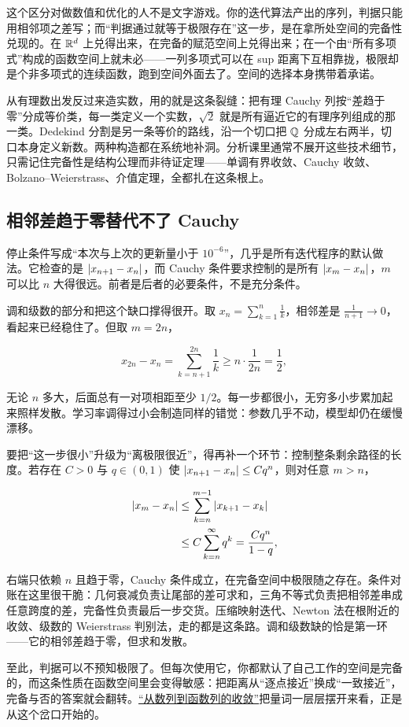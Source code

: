 这个区分对做数值和优化的人不是文字游戏。你的迭代算法产出的序列，判据只能用相邻项之差写；而``判据通过就等于极限存在''这一步，是在拿所处空间的完备性兑现的。在 \(\mathbb{R}^d\) 上兑得出来，在完备的赋范空间上兑得出来；在一个由``所有多项式''构成的函数空间上就未必——一列多项式可以在 sup 距离下互相靠拢，极限却是个非多项式的连续函数，跑到空间外面去了。空间的选择本身携带着承诺。

从有理数出发反过来造实数，用的就是这条裂缝：把有理 Cauchy 列按``差趋于零''分成等价类，每一类定义一个实数，\(\sqrt2\) 就是所有逼近它的有理序列组成的那一类。Dedekind 分割是另一条等价的路线，沿一个切口把 \(\mathbb{Q}\) 分成左右两半，切口本身定义新数。两种构造都在系统地补洞。分析课里通常不展开这些技术细节，只需记住完备性是结构公理而非待证定理——单调有界收敛、Cauchy 收敛、Bolzano--Weierstrass、介值定理，全都扎在这条根上。

\subsection{相邻差趋于零替代不了 Cauchy}

停止条件写成``本次与上次的更新量小于 \(10^{-6}\)''，几乎是所有迭代程序的默认做法。它检查的是 \(\left|x_{n+1}-x_n\right|\)，而 Cauchy 条件要求控制的是所有 \(\left|x_m-x_n\right|\)，\(m\) 可以比 \(n\) 大得很远。前者是后者的必要条件，不是充分条件。

调和级数的部分和把这个缺口撑得很开。取 \(x_n=\sum_{k=1}^{n}\frac1k\)，相邻差是 \(\frac1{n+1}\to0\)，看起来已经稳住了。但取 \(m=2n\)，

\[
x_{2n}-x_n = \sum_{k=n+1}^{2n}\frac1k \ge n\cdot\frac1{2n} = \frac12,
\]

无论 \(n\) 多大，后面总有一对项相距至少 \(1/2\)。每一步都很小，无穷多小步累加起来照样发散。学习率调得过小会制造同样的错觉：参数几乎不动，模型却仍在缓慢漂移。

要把``这一步很小''升级为``离极限很近''，得再补一个环节：控制整条剩余路径的长度。若存在 \(C>0\) 与 \(q\in(0,1)\) 使 \(\left|x_{n+1}-x_n\right|\le Cq^n\)，则对任意 \(m>n\)，

\[
\begin{aligned}
\left|x_m-x_n\right|
&\le \sum_{k=n}^{m-1} \left|x_{k+1}-x_k\right|\\
&\le C\sum_{k=n}^{\infty} q^k
= \frac{Cq^n}{1-q},
\end{aligned}
\]

右端只依赖 \(n\) 且趋于零，Cauchy 条件成立，在完备空间中极限随之存在。条件对账在这里很干脆：几何衰减负责让尾部的差可求和，三角不等式负责把相邻差串成任意跨度的差，完备性负责最后一步交货。压缩映射迭代、Newton 法在根附近的收敛、级数的 Weierstrass 判别法，走的都是这条路。调和级数缺的恰是第一环——它的相邻差趋于零，但求和发散。

至此，判据可以不预知极限了。但每次使用它，你都默认了自己工作的空间是完备的，而这条性质在函数空间里会变得敏感：把距离从``逐点接近''换成``一致接近''，完备与否的答案就会翻转。\hyperref[ch:098]{``从数列到函数列的收敛''}把量词一层层摆开来看，正是从这个岔口开始的。
